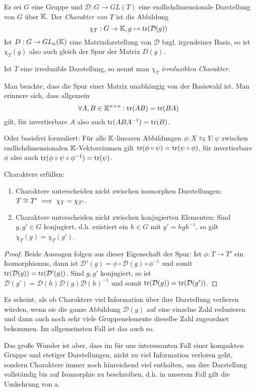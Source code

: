 \begin{definition}[Charaktere]
Es sei $G$ eine Gruppe und $\mathcal{D}: G\to GL(T)$ eine endlichdimensionale Darstellung von $G$ über $\mathbb{K}$. Der \emph{Charakter von $T$} ist die Abbildung
\[\chi_T: G\to \mathbb{K}, g\mapsto \operatorname{tr}(\mathcal{D}(g))\]
Ist $D: G\to GL_n(\mathbb{K})$ eine Matrixdarstellung von $\mathcal{D}$ bzgl. irgendeiner Basis, so ist $\chi_T(g)$ also auch gleich der Spur der Matrix $D(g)$.

Ist $T$ eine irreduzible Darstellung, so nennt man $\chi_T$ \emph{irreduziblen Charakter}.
\end{definition}

\begin{remark}
Man beachte, dass die Spur einer Matrix unabhängig von der Basiswahl ist. Man erinnere sich, dass allgemein
\[\forall A,B\in \mathbb{K}^{n\times n}: \operatorname{tr}(AB) = \operatorname{tr}(BA)\]
gilt, für invertierbare $A$ also auch $\operatorname{tr}(ABA^{-1}) = \operatorname{tr}(B)$.

Oder basisfrei formuliert: Für alle $\mathbb{K}$-linearen Abbildungen $\phi: X \leftrightarrows Y : \psi$ zwischen endlichdimensionalen $\mathbb{K}$-Vektorräumen gilt $\operatorname{tr}(\phi\circ\psi) = \operatorname{tr}(\psi\circ\phi)$, für invertierbare $\phi$ also auch $\operatorname{tr}(\phi\circ\psi\circ\phi^{-1}) = \operatorname{tr}(\psi)$.
\end{remark}

\begin{lemma}
Charaktere erfüllen:
\begin{enumerate}
\item Charaktere unterscheiden nicht zwischen isomorphen Darstellungen: $T\cong T' \implies \chi_T = \chi_{T'}$.
\item Charaktere unterscheiden nicht zwischen konjugierten Elementen: Sind $g,g'\in G$ konjugiert, d.h. existiert ein $h\in G$ mit $g'=hgh^{-1}$, so gilt $\chi_T(g)=\chi_T(g')$.
\end{enumerate}
\end{lemma}
\begin{proof}
Beide Aussagen folgen aus dieser Eigenschaft der Spur: Ist $\phi: T\to T'$ ein Isomorphismus, dann ist $\mathcal{D}'(g) = \phi\circ\mathcal{D}(g)\circ\phi^{-1}$ und somit $\operatorname{tr}(\mathcal{D}(g)) = \operatorname{tr}(\mathcal{D}'(g))$. Sind $g,g'$ konjugiert, so ist $\mathcal{D}(g') = \mathcal{D}(h)\mathcal{D}(g)\mathcal{D}(h)^{-1}$ und somit $\operatorname{tr}(\mathcal{D}(g)) = \operatorname{tr}(\mathcal{D}(g'))$.
\end{proof}

\begin{remark}
Es scheint, als ob Charaktere viel Information über ihre Darstellung verlieren würden, wenn sie die ganze Abbildung $\mathcal{D}(g)$ auf eine einzelne Zahl reduzieren und dann auch noch sehr viele Gruppenelemente dieselbe Zahl zugeordnet bekommen. Im allgemeinsten Fall ist das auch so.

Das große Wunder ist aber, dass im für uns interessanten Fall einer kompakten Gruppe und stetiger Darstellungen, nicht zu viel Information verloren geht, sondern Charaktere immer noch hinreichend viel enthalten, um ihre Darstellung vollständig bis auf Isomorphie zu beschreiben, d.h. in unserem Fall gilt die Umkehrung von a.
\end{remark}


